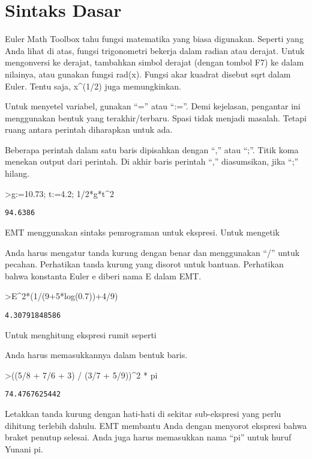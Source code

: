 \documentclass[
]{book}
\begin{document}
\section{Sintaks Dasar}\label{sintaks-dasar}

Euler Math Toolbox tahu fungsi matematika yang biasa digunakan. Seperti yang Anda lihat di atas, fungsi trigonometri bekerja dalam radian atau derajat. Untuk mengonversi ke derajat, tambahkan simbol derajat (dengan tombol F7) ke dalam nilainya, atau gunakan fungsi rad(x). Fungsi akar kuadrat disebut sqrt dalam Euler. Tentu saja, x\^{}(1/2) juga memungkinkan.

Untuk menyetel variabel, gunakan ``='' atau ``:=''. Demi kejelasan, pengantar ini menggunakan bentuk yang terakhir/terbaru. Spasi tidak menjadi masalah. Tetapi ruang antara perintah diharapkan untuk ada.

Beberapa perintah dalam satu baris dipisahkan dengan ``,'' atau ``;''. Titik koma menekan output dari perintah. Di akhir baris perintah ``,'' diasumsikan, jika ``;'' hilang.

\textgreater g:=10.73; t:=4.2; 1/2*g*t\^{}2

\begin{verbatim}
94.6386
\end{verbatim}

EMT menggunakan sintaks pemrograman untuk ekspresi. Untuk mengetik

Anda harus mengatur tanda kurung dengan benar dan menggunakan ``/'' untuk pecahan. Perhatikan tanda kurung yang disorot untuk bantuan. Perhatikan bahwa konstanta Euler e diberi nama E dalam EMT.

\textgreater E\^{}2*(1/(9+5*log(0.7))+4/9)

\begin{verbatim}
4.30791848586
\end{verbatim}

Untuk menghitung ekspresi rumit seperti

Anda harus memasukkannya dalam bentuk baris.

\textgreater((5/8 + 7/6 + 3) / (3/7 + 5/9))\^{}2 * pi

\begin{verbatim}
74.4767625442
\end{verbatim}

Letakkan tanda kurung dengan hati-hati di sekitar sub-ekspresi yang perlu dihitung terlebih dahulu. EMT membantu Anda dengan menyorot ekspresi bahwa braket penutup selesai. Anda juga harus memasukkan nama ``pi'' untuk huruf Yunani pi.
\end{document}
